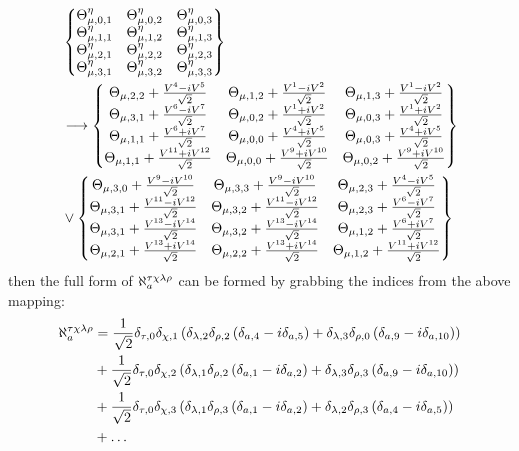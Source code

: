 \begin{align*}
   & \begin{Bmatrix}
       \Theta _{\mu,0,1}^{\eta} & \Theta _{\mu,0,2}^{\eta} & \Theta _{\mu,0,3}^{\eta} \\
       \Theta _{\mu,1,1}^{\eta} & \Theta _{\mu,1,2}^{\eta} & \Theta _{\mu,1,3}^{\eta} \\
       \Theta _{\mu,2,1}^{\eta} & \Theta _{\mu,2,2}^{\eta} & \Theta _{\mu,2,3}^{\eta} \\
       \Theta _{\mu,3,1}^{\eta} & \Theta _{\mu,3,2}^{\eta} & \Theta _{\mu,3,3}^{\eta}
     \end{Bmatrix} \\
   & \longrightarrow
  \begin{Bmatrix}
    \Theta _{\mu,2,2}+\frac{V^4-iV^5}{\sqrt{2}} & \Theta _{\mu,1,2}+\frac{V^1-iV^2}{\sqrt{2}} & \Theta _{\mu,1,3}+\frac{V^1-iV^2}{\sqrt{2}} \\
    \Theta _{\mu,3,1}+\frac{V^{6}-iV^{7}}{\sqrt{2}} & \Theta _{\mu,0,2}+\frac{V^1+iV^2}{\sqrt{2}} & \Theta _{\mu,0,3}+\frac{V^1+iV^2}{\sqrt{2}} \\
    \Theta _{\mu,1,1}+\frac{V^{6}+iV^{7}}{\sqrt{2}} & \Theta _{\mu,0,0}+\frac{V^4+iV^5}{\sqrt{2}} & \Theta _{\mu,0,3}+\frac{V^4+iV^5}{\sqrt{2}} \\
    \Theta _{\mu,1,1}+\frac{V^{11}+iV^{12}}{\sqrt{2}} & \Theta _{\mu,0,0}+\frac{V^9+iV^{10}}{\sqrt{2}} & \Theta _{\mu,0,2}+\frac{V^9+iV^{10}}{\sqrt{2}} \\
  \end{Bmatrix}    \\
   & \lor
  \begin{Bmatrix}
    \Theta _{\mu,3,0}+\frac{V^{9}-iV^{10}}{\sqrt{2}} & \Theta _{\mu,3,3}+\frac{V^{9}-iV^{10}}{\sqrt{2}} & \Theta _{\mu,2,3}+\frac{V^4-iV^5}{\sqrt{2}} \\
    \Theta _{\mu,3,1}+\frac{V^{11}-iV^{12}}{\sqrt{2}} & \Theta _{\mu,3,2}+\frac{V^{11}-iV^{12}}{\sqrt{2}} & \Theta _{\mu,2,3}+\frac{V^{6}-iV^{7}}{\sqrt{2}} \\
    \Theta _{\mu,3,1}+\frac{V^{13}-iV^{14}}{\sqrt{2}} & \Theta _{\mu,3,2}+\frac{V^{13}-iV^{14}}{\sqrt{2}} & \Theta _{\mu,1,2}+\frac{V^{6}+iV^{7}}{\sqrt{2}} \\
    \Theta _{\mu,2,1}+\frac{V^{13}+iV^{14}}{\sqrt{2}} & \Theta _{\mu,2,2}+\frac{V^{13}+iV^{14}}{\sqrt{2}} & \Theta _{\mu,1,2}+\frac{V^{11}+iV^{12}}{\sqrt{2}} \\
  \end{Bmatrix}
\end{align*}
then the full form of \(\aleph_a^{\tau \chi \lambda \rho}\) can be formed by grabbing the indices from the above mapping:
\begin{align*}
  \aleph_a^{\tau \chi \lambda \rho}
   & =\alentry{0}{1}{2}{2}{4}{-}{5}{3}{0}{9}{-}{10} \\
   & +\alentry{0}{2}{1}{2}{1}{-}{2}{3}{3}{9}{-}{10} \\
   & +\alentry{0}{3}{1}{3}{1}{-}{2}{2}{3}{4}{-}{5}  \\
   & +\ldots
\end{align*}

